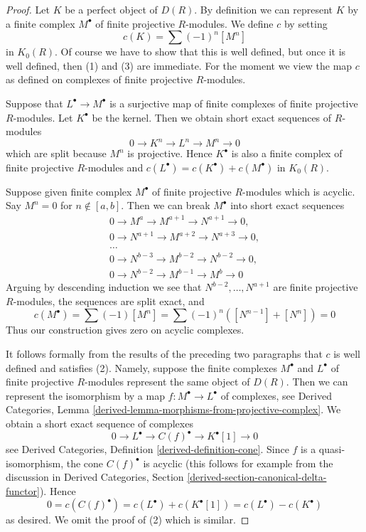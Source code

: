 \begin{proof}
Let $K$ be a perfect object of $D(R)$. By definition we can represent
$K$ by a finite complex $M^\bullet$ of finite projective $R$-modules.
We define $c$ by setting
$$
c(K) = \sum (-1)^n[M^n]
$$
in $K_0(R)$. Of course we have to show that this is well defined,
but once it is well defined, then (1) and (3) are immediate.
For the moment we view the map $c$ as defined on complexes of
finite projective $R$-modules.

\medskip\noindent
Suppose that $L^\bullet \to M^\bullet$ is a surjective map
of finite complexes of finite projective $R$-modules.
Let $K^\bullet$ be the kernel. Then we obtain short exact
sequences of $R$-modules
$$
0 \to K^n \to L^n \to M^n \to 0
$$
which are split because $M^n$ is projective. Hence $K^\bullet$
is also a finite complex of finite projective $R$-modules and
$c(L^\bullet) = c(K^\bullet) + c(M^\bullet)$ in $K_0(R)$.

\medskip\noindent
Suppose given finite complex $M^\bullet$ of finite projective $R$-modules
which is acyclic. Say $M^n = 0$ for $n \not \in [a, b]$. Then we
can break $M^\bullet$ into short exact sequences
$$
\begin{matrix}
0 \to M^a \to M^{a + 1} \to N^{a + 1} \to 0, \\
0 \to N^{a + 1} \to M^{a + 2} \to N^{a + 3} \to 0, \\
\ldots \\
0 \to N^{b - 3} \to M^{b - 2} \to N^{b - 2} \to 0, \\
0 \to N^{b - 2} \to M^{b - 1} \to M^b \to 0
\end{matrix}
$$
Arguing by descending induction we see that $N^{b - 2}, \ldots, N^{a + 1}$
are finite projective $R$-modules, the sequences are split exact, and
$$
c(M^\bullet) = \sum (-1)[M^n] = \sum (-1)^n([N^{n - 1}] + [N^n]) = 0
$$
Thus our construction gives zero on acyclic complexes.

\medskip\noindent
It follows formally from the results of the preceding two
paragraphs that $c$ is well defined and satisfies (2). Namely,
suppose the finite complexes $M^\bullet$ and $L^\bullet$ of
finite projective $R$-modules represent the same object
of $D(R)$. Then we can represent the isomorphism by a map
$f : M^\bullet \to L^\bullet$ of complexes, see
Derived Categories, Lemma \ref{derived-lemma-morphisms-from-projective-complex}.
We obtain a short exact sequence of complexes
$$
0 \to L^\bullet \to C(f)^\bullet \to K^\bullet[1] \to 0
$$
see Derived Categories, Definition \ref{derived-definition-cone}.
Since $f$ is a quasi-isomorphism, the cone $C(f)^\bullet$ is
acyclic (this follows for example from the discussion in
Derived Categories, Section \ref{derived-section-canonical-delta-functor}).
Hence
$$
0 = c(C(f)^\bullet) = c(L^\bullet) + c(K^\bullet[1]) =
c(L^\bullet) - c(K^\bullet)
$$
as desired. We omit the proof of (2) which is similar.
\end{proof}

